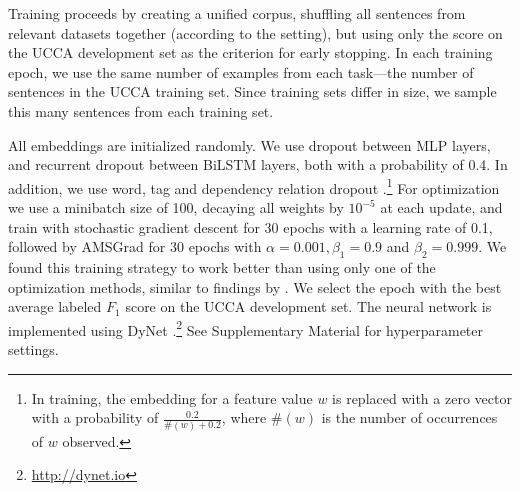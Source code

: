 \documentclass[11pt,a4paper]{article}
\newcommand{\oa}[1]{\footnote{\color{red}OA: #1}}
\DeclareMathOperator*{\argmax}{argmax}
\begin{document}
Training proceeds by creating a unified corpus, shuffling all sentences from relevant
datasets together (according to the setting),
but using only the score on the UCCA development set as the criterion for early stopping.
In each training epoch, we use the same number of examples from each task---the
number of sentences in the UCCA training set.
Since training sets differ in size, we sample this many sentences from each training set.

All embeddings are initialized randomly.
We use dropout \cite{srivastava2014dropout} between MLP layers, and recurrent dropout
\cite{NIPS2016_6241} between BiLSTM layers, both with a probability of 0.4.
In addition, we use word, tag and dependency relation dropout \cite{kiperwasser2016simple}.\footnote{In
training, the embedding for a feature value $w$ is replaced with a zero vector
with a probability of $\frac{0.2}{\#(w)+0.2}$, where $\#(w)$ is the number of occurrences of
$w$ observed.}
For optimization we use a minibatch size of 100, decaying all weights by $10^{-5}$ at each update,
and train with stochastic gradient descent for 30 epochs with a learning
rate of 0.1, followed by AMSGrad \cite{j.2018on} for 30 epochs with
$\alpha=0.001,\beta_1=0.9$ and $\beta_2=0.999$.
We found this training strategy to work better than using only one of the optimization methods,
similar to findings by \citet{keskar2017improving}.
We select the epoch with the best average labeled $F_1$ score on the UCCA development set.
The neural network is implemented using DyNet \cite{neubig2017dynet}.\footnote{\url{http://dynet.io}}
See Supplementary Material for hyperparameter settings.

%
%
\end{document}
